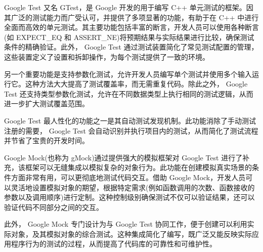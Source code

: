 Google Test 又名 GTest，是 Google 开发的用于编写 C++ 单元测试的框架。因其广泛的测试能力而广受认可，并提供了多项显著的功能，有助于在 C++ 中进行全面而高效的单元测试。其主要功能包括丰富的断言，开发人员可以使用各种断言(如 EXPECT\_EQ 和 ASSERT\_NE)将预期结果与实际结果进行比较，确保测试条件的精确验证。此外， Google Test 通过测试装置简化了常见测试配置的管理，这些装置定义了设置和拆卸操作，为每个测试提供了一致的环境。

另一个重要功能是支持参数化测试，允许开发人员编写单个测试并使用多个输入运行它。这种方法大大提高了测试覆盖率，而无需重复代码。除此之外， Google Test 还支持类型参数化测试，允许在不同数据类型上执行相同的测试逻辑，从而进一步扩大测试覆盖范围。

Google Test 最人性化的功能之一是其自动测试发现机制。此功能消除了手动测试注册的需要， Google Test 会自动识别并执行项目内的测试，从而简化了测试流程并节省了宝贵的开发时间。

Google Mock(也称为 gMock)通过提供强大的模拟框架对 Google Test 进行了补充，该框架可以无缝集成以模拟复杂的对象行为。此功能在创建模拟真实场景的条件方面非常有用，可以更彻底地测试代码交互。借助 Google Mock，开发人员可以灵活地设置模拟对象的期望，根据特定需求(例如函数调用的次数、函数接收的参数以及调用顺序)进行定制。这种控制级别确保测试不仅可以验证结果，还可以验证代码不同部分之间的交互。

此外， Google Mock 专门设计为与 Google Test 协同工作，便于创建可以利用实际对象，及其模拟对象的综合测试。这种集成简化了编写，既广泛又能反映实际应用程序行为的测试的过程，从而提高了代码库的可靠性和可维护性。
